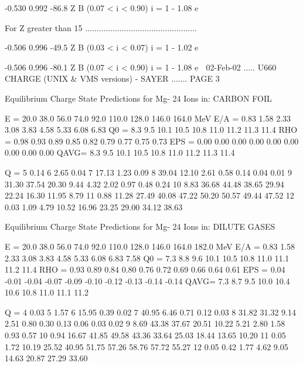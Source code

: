                                        -0.530  0.992
                                -86.8 Z       B         (0.07 < i < 0.90)
                  i = 1 - 1.08 e
 
   For  Z  greater than  15  .................................................
 
                                       -0.506  0.996
                                -49.5 Z       B         (0.03 < i < 0.07)
                  i = 1 - 1.02 e
 
                                       -0.506  0.996
                                -80.1 Z       B         (0.07 < i < 0.90)
                  i = 1 - 1.08 e
    
   02-Feb-02 ..... U660  CHARGE (UNIX & VMS versions) - SAYER ....... PAGE   3
 
 
   Equilibrium Charge State Predictions for Mg- 24 Ions in: CARBON  FOIL
 
     E =  20.0  38.0  56.0  74.0  92.0 110.0 128.0 146.0 164.0 MeV
   E/A =  0.83  1.58  2.33  3.08  3.83  4.58  5.33  6.08  6.83
    Q0 =   8.3   9.5  10.1  10.5  10.8  11.0  11.2  11.3  11.4
   RHO =  0.98  0.93  0.89  0.85  0.82  0.79  0.77  0.75  0.73
   EPS =  0.00  0.00  0.00  0.00  0.00  0.00  0.00  0.00  0.00
   QAVG=   8.3   9.5  10.1  10.5  10.8  11.0  11.2  11.3  11.4
 
   Q = 5  0.14
       6  2.65  0.04
       7 17.13  1.23  0.09
       8 39.04 12.10  2.61  0.58  0.14  0.04  0.01
       9 31.30 37.54 20.30  9.44  4.32  2.02  0.97  0.48  0.24
      10  8.83 36.68 44.48 38.65 29.94 22.24 16.30 11.95  8.79
      11  0.88 11.28 27.49 40.08 47.22 50.20 50.57 49.44 47.52
      12  0.03  1.09  4.79 10.52 16.96 23.25 29.00 34.12 38.63
 
 
   Equilibrium Charge State Predictions for Mg- 24 Ions in: DILUTE GASES
 
     E =  20.0  38.0  56.0  74.0  92.0 110.0 128.0 146.0 164.0 182.0 MeV
   E/A =  0.83  1.58  2.33  3.08  3.83  4.58  5.33  6.08  6.83  7.58
    Q0 =   7.3   8.8   9.6  10.1  10.5  10.8  11.0  11.1  11.2  11.4
   RHO =  0.93  0.89  0.84  0.80  0.76  0.72  0.69  0.66  0.64  0.61
   EPS =  0.04 -0.01 -0.04 -0.07 -0.09 -0.10 -0.12 -0.13 -0.14 -0.14
   QAVG=   7.3   8.7   9.5  10.0  10.4  10.6  10.8  11.0  11.1  11.2
 
   Q = 4  0.03
       5  1.57
       6 15.95  0.39  0.02
       7 40.95  6.46  0.71  0.12  0.03
       8 31.82 31.32  9.14  2.51  0.80  0.30  0.13  0.06  0.03  0.02
       9  8.69 43.38 37.67 20.51 10.22  5.21  2.80  1.58  0.93  0.57
      10  0.94 16.67 41.85 49.58 43.36 33.64 25.03 18.44 13.65 10.20
      11  0.05  1.72 10.19 25.52 40.95 51.75 57.26 58.76 57.72 55.27
      12        0.05  0.42  1.77  4.62  9.05 14.63 20.87 27.29 33.60
